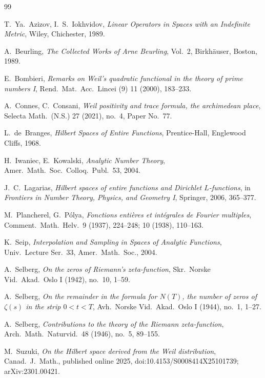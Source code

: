 \documentclass[11pt]{amsart}
\theoremstyle{definition}
\theoremstyle{remark}
\begin{document}
\begin{thebibliography}{99}

 T.~Ya.~Azizov, I.~S.~Iokhvidov, \emph{Linear Operators in
Spaces with an Indefinite Metric}, Wiley, Chichester, 1989.

 A.~Beurling, \emph{The Collected Works of Arne Beurling}, Vol.~2,
Birkh\"auser, Boston, 1989.

 E.~Bombieri, \emph{Remarks on Weil's quadratic functional in the
theory of prime numbers I}, Rend.\ Mat.\ Acc.\ Lincei (9) 11 (2000), 183--233.

 A.~Connes, C.~Consani, \emph{Weil positivity and trace formula,
the archimedean place}, Selecta Math.\ (N.S.) 27 (2021), no.~4, Paper No.~77.

 L.~de~Branges, \emph{Hilbert Spaces of Entire Functions},
Prentice-Hall, Englewood Cliffs, 1968.

 H.~Iwaniec, E.~Kowalski, \emph{Analytic Number Theory}, Amer.\
Math.\ Soc.\ Colloq.\ Publ.\ 53, 2004.

 J.~C.~Lagarias, \emph{Hilbert spaces of entire functions and Dirichlet
$L$-functions}, in \emph{Frontiers in Number Theory, Physics, and Geometry I}, Springer,
2006, 365--377.

 M.~Plancherel, G.~P\'olya, \emph{Fonctions enti\`eres et
int\'egrales de Fourier multiples}, Comment.\ Math.\ Helv.\ 9 (1937), 224--248; 10 (1938),
110--163.

 K.~Seip, \emph{Interpolation and Sampling in Spaces of Analytic Functions},
Univ.\ Lecture Ser.\ 33, Amer.\ Math.\ Soc., 2004.

 A.~Selberg, \emph{On the zeros of Riemann's zeta-function}, Skr.\
Norske Vid.\ Akad.\ Oslo I (1942), no.~10, 1--59.

 A.~Selberg, \emph{On the remainder in the formula for $N(T)$, the number
of zeros of $\zeta(s)$ in the strip $0<t<T$}, Avh.\ Norske Vid.\ Akad.\ Oslo I (1944),
no.~1, 1--27.

 A.~Selberg, \emph{Contributions to the theory of the Riemann
zeta-function}, Arch.\ Math.\ Naturvid.\ 48 (1946), no.~5, 89--155.

\bibitem{Suzuki} M.~Suzuki, \emph{On the Hilbert space derived from the Weil
distribution}, Canad.\ J.\ Math., published online 2025,
doi:10.4153/S0008414X25101739; arXiv:2301.00421.


\end{thebibliography}
\end{document}
